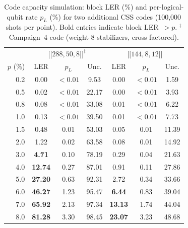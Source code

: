 \documentclass[aps,prxquantum,twocolumn,superscriptaddress,nofootinbib]{revtex4-2}
\newcommand{\dblbrk}[1]{\ensuremath{\lbrack\!\lbrack #1 \rbrack\!\rbrack}}
\newcommand{\code}[1]{\dblbrk{#1}}
\begin{document}
\begin{table}[t]
\centering
\caption{Code capacity simulation: block LER (\%) and per-logical-qubit rate $p_L$ (\%) for two additional CSS codes (100{,}000 shots per point).
Bold entries indicate block LER~$> p$.
$^\ddagger$Campaign~4 code (weight-8 stabilizers, cross-factored).}
\label{tab:threshold_full_extra}
\small
\begin{tabular}{r|ccc|ccc}
\toprule
& \multicolumn{3}{c|}{$\code{288,50,8}^{\ddagger}$} & \multicolumn{3}{c}{$\code{144,8,12}$} \\
$p$ (\%) & LER & $p_L$ & Unc. & LER & $p_L$ & Unc. \\
\midrule
0.2 & 0.00 & ${<}0.01$ & 9.53 & 0.00 & ${<}0.01$ & 1.59 \\
0.5 & 0.02 & ${<}0.01$ & 22.17 & 0.00 & ${<}0.01$ & 3.93 \\
0.8 & 0.08 & ${<}0.01$ & 33.08 & 0.01 & ${<}0.01$ & 6.22 \\
1.0 & 0.13 & ${<}0.01$ & 39.50 & 0.01 & ${<}0.01$ & 7.73 \\
1.5 & 0.48 & 0.01 & 53.03 & 0.05 & 0.01 & 11.39 \\
2.0 & 1.22 & 0.02 & 63.58 & 0.08 & 0.01 & 14.92 \\
3.0 & \textbf{4.71} & 0.10 & 78.19 & 0.29 & 0.04 & 21.63 \\
4.0 & \textbf{12.74} & 0.27 & 87.01 & 0.91 & 0.11 & 27.86 \\
5.0 & \textbf{27.20} & 0.63 & 92.31 & 2.72 & 0.34 & 33.66 \\
6.0 & \textbf{46.27} & 1.23 & 95.47 & \textbf{6.44} & 0.83 & 39.04 \\
7.0 & \textbf{65.92} & 2.13 & 97.34 & \textbf{13.13} & 1.74 & 44.04 \\
8.0 & \textbf{81.28} & 3.30 & 98.45 & \textbf{23.07} & 3.23 & 48.68 \\
\bottomrule
\end{tabular}
\end{table}
\end{document}
